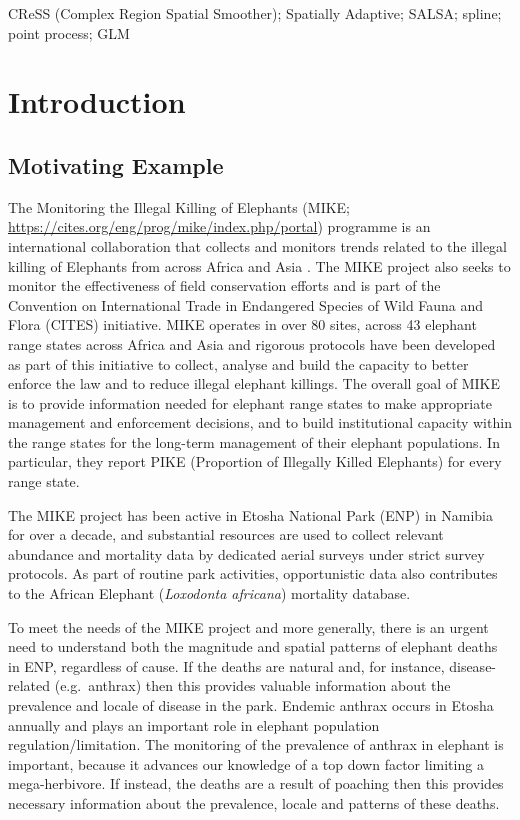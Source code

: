 \documentclass[letterpaper]{interact}
\begin{document}
\begin{keywords}
CReSS (Complex Region Spatial Smoother); Spatially Adaptive; SALSA; spline; point process; GLM
\end{keywords}


\section{Introduction}

\subsection{Motivating Example}

The Monitoring the Illegal Killing of Elephants (MIKE; \url   {https://cites.org/eng/prog/mike/index.php/portal}) programme is an international collaboration that collects and monitors trends related to the illegal killing of Elephants from across Africa and Asia \cite{mike2018}. The MIKE project also seeks to monitor the effectiveness of field conservation efforts and is part of the Convention on International Trade in Endangered Species of Wild Fauna and Flora (CITES) initiative. MIKE operates in over 80 sites, across 43 elephant range states across Africa and Asia and rigorous protocols have been developed as part of this initiative to collect, analyse and build the capacity to better enforce the law and to reduce illegal elephant killings. The overall goal of MIKE is to provide information needed for elephant range states to make appropriate management and enforcement decisions, and to build institutional capacity within the range states for the long-term management of their elephant populations. In particular, they report PIKE (Proportion of Illegally Killed Elephants) for every range state. 

The MIKE project has been active in Etosha National Park (ENP) in Namibia for over a decade, and substantial resources are used to collect relevant abundance and mortality data by dedicated aerial surveys under strict survey protocols. As part of routine park activities, opportunistic data also contributes to the African Elephant (\emph{Loxodonta africana}) mortality database. 

To meet the needs of the MIKE project and more generally, there is an urgent need to understand both the magnitude and spatial patterns of elephant deaths in ENP, regardless of cause. If the deaths are natural and, for instance, disease-related (e.g.~anthrax) then this provides valuable information about the prevalence and locale of disease in the park. Endemic anthrax occurs in Etosha annually \cite{Turner2013} and plays an important role in elephant population regulation/limitation. The monitoring of the prevalence of anthrax in elephant is important, because it advances our knowledge of a top down factor limiting a mega-herbivore. If instead, the deaths are a result of poaching then this provides necessary information about the prevalence, locale and patterns of these deaths. 
\end{document}
